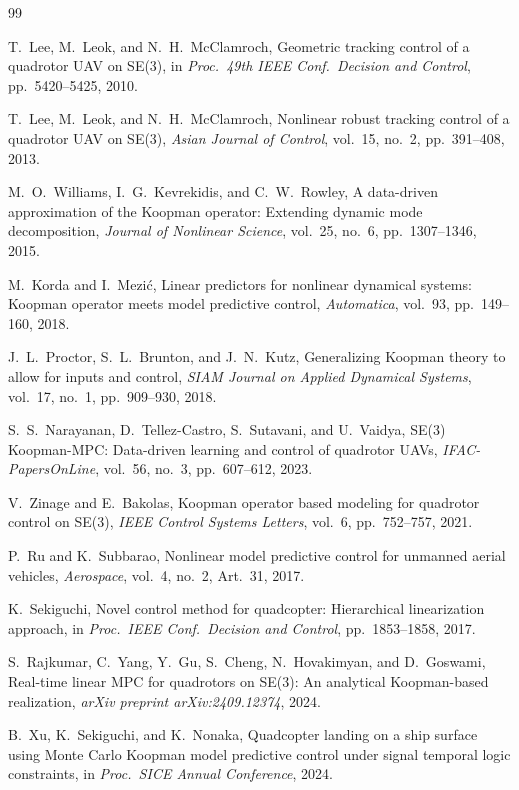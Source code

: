 \documentclass{article}
\begin{document}
\begin{thebibliography}{99}

T.~Lee, M.~Leok, and N.~H.~McClamroch,
Geometric tracking control of a quadrotor UAV on SE(3),
in \emph{Proc.\ 49th IEEE Conf.\ Decision and Control},
pp.~5420--5425, 2010.

T.~Lee, M.~Leok, and N.~H.~McClamroch,
Nonlinear robust tracking control of a quadrotor UAV on SE(3),
\emph{Asian Journal of Control},
vol.~15, no.~2, pp.~391--408, 2013.

M.~O.~Williams, I.~G.~Kevrekidis, and C.~W.~Rowley,
A data-driven approximation of the Koopman operator: Extending dynamic mode decomposition,
\emph{Journal of Nonlinear Science},
vol.~25, no.~6, pp.~1307--1346, 2015.

M.~Korda and I.~Mezi\'c,
Linear predictors for nonlinear dynamical systems: Koopman operator meets model predictive control,
\emph{Automatica},
vol.~93, pp.~149--160, 2018.

J.~L.~Proctor, S.~L.~Brunton, and J.~N.~Kutz,
Generalizing Koopman theory to allow for inputs and control,
\emph{SIAM Journal on Applied Dynamical Systems},
vol.~17, no.~1, pp.~909--930, 2018.

S.~S.~Narayanan, D.~Tellez-Castro, S.~Sutavani, and U.~Vaidya,
SE(3) Koopman-MPC: Data-driven learning and control of quadrotor UAVs,
\emph{IFAC-PapersOnLine},
vol.~56, no.~3, pp.~607--612, 2023.

V.~Zinage and E.~Bakolas,
Koopman operator based modeling for quadrotor control on SE(3),
\emph{IEEE Control Systems Letters},
vol.~6, pp.~752--757, 2021.

P.~Ru and K.~Subbarao,
Nonlinear model predictive control for unmanned aerial vehicles,
\emph{Aerospace},
vol.~4, no.~2, Art.~31, 2017.

K.~Sekiguchi,
Novel control method for quadcopter: Hierarchical linearization approach,
in \emph{Proc.\ IEEE Conf.\ Decision and Control},
pp.~1853--1858, 2017.

S.~Rajkumar, C.~Yang, Y.~Gu, S.~Cheng, N.~Hovakimyan, and D.~Goswami,
Real-time linear MPC for quadrotors on SE(3): An analytical Koopman-based realization,
\emph{arXiv preprint arXiv:2409.12374}, 2024.

B.~Xu, K.~Sekiguchi, and K.~Nonaka,
Quadcopter landing on a ship surface using Monte Carlo Koopman model predictive control under signal temporal logic constraints,
in \emph{Proc.\ SICE Annual Conference}, 2024.

\end{thebibliography}
\end{document}
